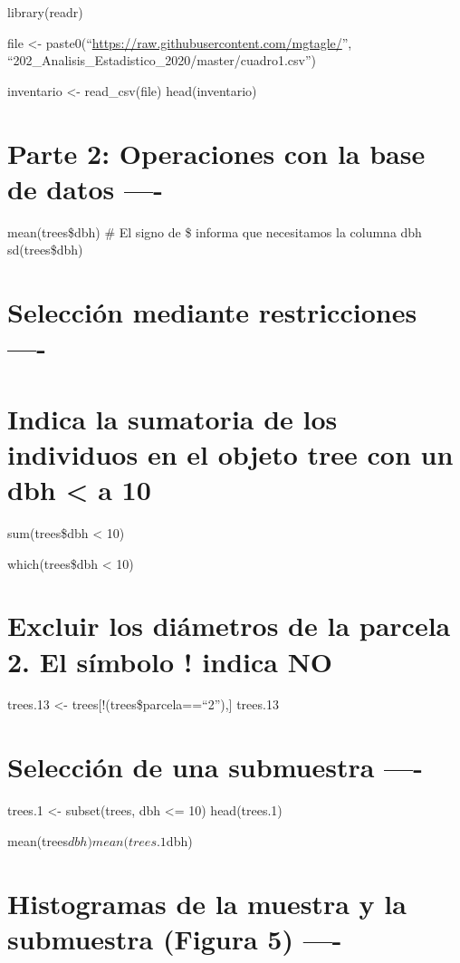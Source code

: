 \documentclass[
]{article}
\begin{document}
library(readr)

file \textless-
paste0(``\url{https://raw.githubusercontent.com/mgtagle/}'',
``202\_Analisis\_Estadistico\_2020/master/cuadro1.csv'')

inventario \textless- read\_csv(file) head(inventario)

\section{Parte 2: Operaciones con la base de datos
----}\label{parte-2-operaciones-con-la-base-de-datos--}

mean(trees\$dbh) \# El signo de \$ informa que necesitamos la columna
dbh sd(trees\$dbh)

\section{Selección mediante restricciones
----}\label{selecciuxf3n-mediante-restricciones--}

\section{Indica la sumatoria de los individuos en el objeto tree con un
dbh \textless{} a
10}\label{indica-la-sumatoria-de-los-individuos-en-el-objeto-tree-con-un-dbh-a-10}

sum(trees\$dbh \textless{} 10)

which(trees\$dbh \textless{} 10)

\section{Excluir los diámetros de la parcela 2. El símbolo ! indica
NO}\label{excluir-los-diuxe1metros-de-la-parcela-2.-el-suxedmbolo-indica-no}

trees.13 \textless- trees{[}!(trees\$parcela==``2''),{]} trees.13

\section{Selección de una submuestra
----}\label{selecciuxf3n-de-una-submuestra--}

trees.1 \textless- subset(trees, dbh \textless= 10) head(trees.1)

mean(trees\(dbh)
mean(trees.1\)dbh)

\section{Histogramas de la muestra y la submuestra (Figura 5)
----}\label{histogramas-de-la-muestra-y-la-submuestra-figura-5--}
\end{document}
